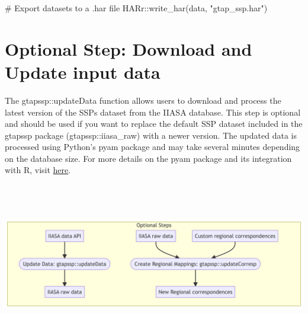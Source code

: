 \documentclass[
  letterpaper,
  DIV=11,
  numbers=noendperiod]{scrartcl}
\newenvironment{Shaded}{}{}
\newcommand{\CommentTok}[1]{\textcolor[rgb]{0.54,0.53,0.53}{#1}}
\newcommand{\FunctionTok}[1]{\textcolor[rgb]{0.39,0.29,0.61}{#1}}
\newcommand{\NormalTok}[1]{\textcolor[rgb]{0.12,0.11,0.11}{#1}}
\newcommand{\SpecialCharTok}[1]{\textcolor[rgb]{0.24,0.68,0.91}{#1}}
\newcommand{\StringTok}[1]{\textcolor[rgb]{0.75,0.01,0.01}{#1}}
\begin{document}
\begin{Shaded}
\begin{Highlighting}[]
\CommentTok{\# Export datasets to a .har file}
\NormalTok{HARr}\SpecialCharTok{::}\FunctionTok{write\_har}\NormalTok{(data, }\StringTok{"gtap\_ssp.har"}\NormalTok{)}
\end{Highlighting}
\end{Shaded}

\section{Optional Step: Download and Update input
data}\label{optional-step-download-and-update-input-data}

The gtapssp::updateData function allows users to download and process
the latest version of the SSPs dataset from the IIASA database. This
step is optional and should be used if you want to replace the default
SSP dataset included in the gtapssp package (gtapssp::iiasa\_raw) with a
newer version. The updated data is processed using Python's pyam package
and may take several minutes depending on the database size. For more
details on the pyam package and its integration with R, visit
\href{https://pyam-iamc.readthedocs.io/en/stable/R_tutorials/pyam_R_tutorial.html}{here}.

\label{optinional}
\includegraphics[width=9.29in,height=2.79in]{index_files/figure-latex/mermaid-figure-2.png}
\end{document}
